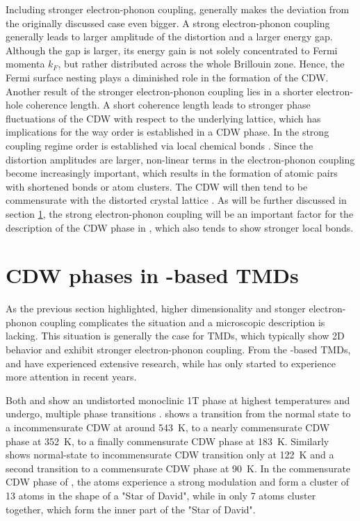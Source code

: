 Including stronger electron-phonon coupling, generally makes the deviation from the originally discussed case even bigger.
A strong electron-phonon coupling generally leads to larger amplitude of the distortion and a larger energy gap.
Although the gap is larger, its energy gain is not solely concentrated to Fermi momenta $k_F$, but rather distributed across the whole Brillouin zone.
Hence, the Fermi surface nesting plays a diminished role in the formation of the CDW.
Another result of the stronger electron-phonon coupling lies in a shorter electron-hole coherence length.
A short coherence length leads to stronger phase fluctuations of the CDW with respect to the underlying lattice, which has implications for the way order is established in a CDW phase.
In the strong coupling regime order is established via local chemical bonds \cite{rossnagel_origin_2011, whangbo_analogies_1992, mcmillan_microscopic_1977,haas_chemical_1978,inglesfield_bonding_1980}.
Since the distortion amplitudes are larger, non-linear terms in the electron-phonon coupling become increasingly important, which results in the formation of atomic pairs with shortened bonds or atom clusters.
The CDW will then tend to be commensurate with the distorted crystal lattice \cite{rossnagel_origin_2011}.
As will be further discussed in section \ref{sec:cdw_tate2}, the strong electron-phonon coupling will be an important factor for the description of the CDW phase in , which also tends to show stronger local bonds.


\section{CDW phases in -based TMDs}
\label{sec:cdw_tate2}

As the previous section highlighted, higher dimensionality and stonger electron-phonon coupling complicates the situation and a microscopic description is lacking.
This situation is generally the case for TMDs, which typically show 2D behavior and exhibit stronger electron-phonon coupling.
From the -based TMDs,  and  have experienced extensive research, while  has only started to experience more attention in recent years.

Both  and  show an undistorted monoclinic 1T phase at highest temperatures and undergo, multiple phase transitions \cite{pouget_structural_2024,lin_evidence_2022}.
 shows a transition from the normal state to a incommensurate CDW at around \qty{543}{\kelvin}, to a nearly commensurate CDW phase at \qty{352}{\kelvin}, to a finally commensurate CDW phase at \qty{183}{\kelvin}.
Similarly  shows normal-state to incommensurate CDW transition only at \qty{122}{\kelvin} and a second transition to a commensurate CDW phase at \qty{90}{\kelvin}.
In the commensurate CDW phase of , the  atoms experience a strong modulation and form a cluster of 13 atoms in the shape of a "Star of David", while in  only 7 atoms cluster together, which form the inner part of the "Star of David".

